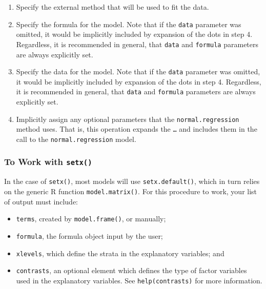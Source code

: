 \begin{enumerate}

	\item Specify the external method that will be used to fit the data.
  
  \item Specify the formula for the model. Note that if the {\tt data} parameter was omitted, it would be implicitly included by expansion of the dots in step 4. Regardless, it is recommended in general, that {\tt data} and {\tt formula} parameters are always explicitly set.

	\item  Specify the data for the model. Note that if the {\tt data} parameter was omitted, it would be implicitly included by expansion of the dots in step 4. Regardless, it is recommended in general, that {\tt data} and {\tt formula} parameters are always explicitly set.

	\item Implicitly assign any optional parameters that the {\tt normal.regression} method uses. That is, this operation expands the {\tt\dots} and includes them in the call to the {\tt normal.regression} model.
	
\end{enumerate}



\subsubsection{To Work with {\tt setx()}}



In the case of {\tt setx()}, most models will use {\tt setx.default()}, which in turn relies on the generic R function {\tt model.matrix()}.  For this procedure to work, your list of output
must include:  

\begin{itemize}

	\item {\tt terms}, created by {\tt model.frame()}, or manually;

	\item {\tt formula}, the formula object input by the user;

	\item {\tt xlevels}, which define the strata in the explanatory variables; and

	\item {\tt contrasts}, an optional element which defines the type of factor variables used in the explanatory variables.  See {\tt help(contrasts)} for more information.

\end{itemize}


